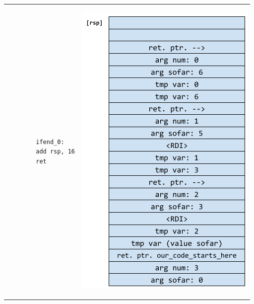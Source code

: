 \begin{center}
\begin{tabular}{p{3in} p{3in}}
\begin{verbatim}
        ifend_0:
        add rsp, 16
        ret\end{verbatim}
        & \begin{center}
            \includegraphics[scale=0.6]{assets/tail_rec_diagram.png}
        \end{center}
    \end{tabular}
\end{center}


